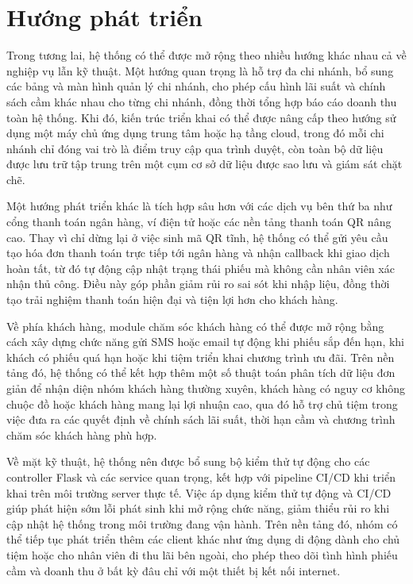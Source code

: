 \documentclass[13pt,a4paper]{extreport}
\begin{document}
\section{Hướng phát triển}

Trong tương lai, hệ thống có thể được mở rộng theo nhiều hướng khác nhau cả về nghiệp vụ lẫn kỹ thuật. Một hướng quan trọng là hỗ trợ đa chi nhánh, bổ sung các bảng và màn hình quản lý chi nhánh, cho phép cấu hình lãi suất và chính sách cầm khác nhau cho từng chi nhánh, đồng thời tổng hợp báo cáo doanh thu toàn hệ thống. Khi đó, kiến trúc triển khai có thể được nâng cấp theo hướng sử dụng một máy chủ ứng dụng trung tâm hoặc hạ tầng cloud, trong đó mỗi chi nhánh chỉ đóng vai trò là điểm truy cập qua trình duyệt, còn toàn bộ dữ liệu được lưu trữ tập trung trên một cụm cơ sở dữ liệu được sao lưu và giám sát chặt chẽ.

Một hướng phát triển khác là tích hợp sâu hơn với các dịch vụ bên thứ ba như cổng thanh toán ngân hàng, ví điện tử hoặc các nền tảng thanh toán QR nâng cao. Thay vì chỉ dừng lại ở việc sinh mã QR tĩnh, hệ thống có thể gửi yêu cầu tạo hóa đơn thanh toán trực tiếp tới ngân hàng và nhận callback khi giao dịch hoàn tất, từ đó tự động cập nhật trạng thái phiếu mà không cần nhân viên xác nhận thủ công. Điều này góp phần giảm rủi ro sai sót khi nhập liệu, đồng thời tạo trải nghiệm thanh toán hiện đại và tiện lợi hơn cho khách hàng.

Về phía khách hàng, module chăm sóc khách hàng có thể được mở rộng bằng cách xây dựng chức năng gửi SMS hoặc email tự động khi phiếu sắp đến hạn, khi khách có phiếu quá hạn hoặc khi tiệm triển khai chương trình ưu đãi. Trên nền tảng đó, hệ thống có thể kết hợp thêm một số thuật toán phân tích dữ liệu đơn giản để nhận diện nhóm khách hàng thường xuyên, khách hàng có nguy cơ không chuộc đồ hoặc khách hàng mang lại lợi nhuận cao, qua đó hỗ trợ chủ tiệm trong việc đưa ra các quyết định về chính sách lãi suất, thời hạn cầm và chương trình chăm sóc khách hàng phù hợp.

Về mặt kỹ thuật, hệ thống nên được bổ sung bộ kiểm thử tự động cho các controller Flask và các service quan trọng, kết hợp với pipeline CI/CD khi triển khai trên môi trường server thực tế. Việc áp dụng kiểm thử tự động và CI/CD giúp phát hiện sớm lỗi phát sinh khi mở rộng chức năng, giảm thiểu rủi ro khi cập nhật hệ thống trong môi trường đang vận hành. Trên nền tảng đó, nhóm có thể tiếp tục phát triển thêm các client khác như ứng dụng di động dành cho chủ tiệm hoặc cho nhân viên đi thu lãi bên ngoài, cho phép theo dõi tình hình phiếu cầm và doanh thu ở bất kỳ đâu chỉ với một thiết bị kết nối internet.
\end{document}
